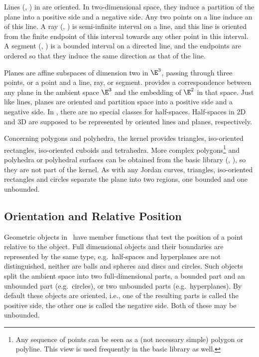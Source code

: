 Lines  (, ) in {\cgal} are oriented. In 
two-dimensional space, they induce a partition of the plane
into a positive side and a negative side. 
Any two points on a line induce an 
of this line. 
A ray (, ) is semi-infinite interval on a line, 
and this line is oriented from the finite endpoint of this interval towards 
any other point in this interval. A segment (, 
) is a bounded interval on a directed line,
and the endpoints are ordered so that they induce the same direction 
as that of the line.  

Planes are affine subspaces of dimension two in $\E^3$, passing through 
three points, or a point and a line, ray, or segment. 
{\cgal} provides a correspondence between any plane in the ambient 
space $\E^3$ and the embedding of $\E^2$ in that space.
Just like lines, planes are oriented and partition space into a positive side 
and a negative side.
In \cgal, there are no special classes for half-spaces. Half-spaces in 2D and
3D are supposed to be represented by oriented lines and planes, respectively.

Concerning polygons and polyhedra, the kernel provides triangles,
iso-oriented rectangles, iso-oriented cuboids and tetrahedra. 
More complex polygons\footnote{Any sequence of points can be seen as
a (not necessary simple) polygon or polyline. This view is used 
frequently in the basic library as well.}
and polyhedra or polyhedral surfaces can be obtained 
from the basic library (, ), 
so they are not part of the kernel. 
As with any Jordan curves, triangles, iso-oriented rectangles and circles
separate the plane into two regions, one bounded and one unbounded.  

\subsection{Orientation and Relative Position}
Geometric objects in \cgal\ have member functions that test the
position of a point relative to the object.  Full dimensional objects
and their boundaries are represented by the same type, 
e.g.\ half-spaces and hyperplanes are not distinguished, neither are balls and
spheres and discs and circles. Such objects split the ambient space into two
full-dimensional parts, a bounded part and an unbounded part 
(e.g.\ circles), or two unbounded parts (e.g.\ hyperplanes). By default these
objects are oriented, i.e., one of the resulting parts is called the
positive side, the other one is called the negative side. Both of
these may be unbounded.

